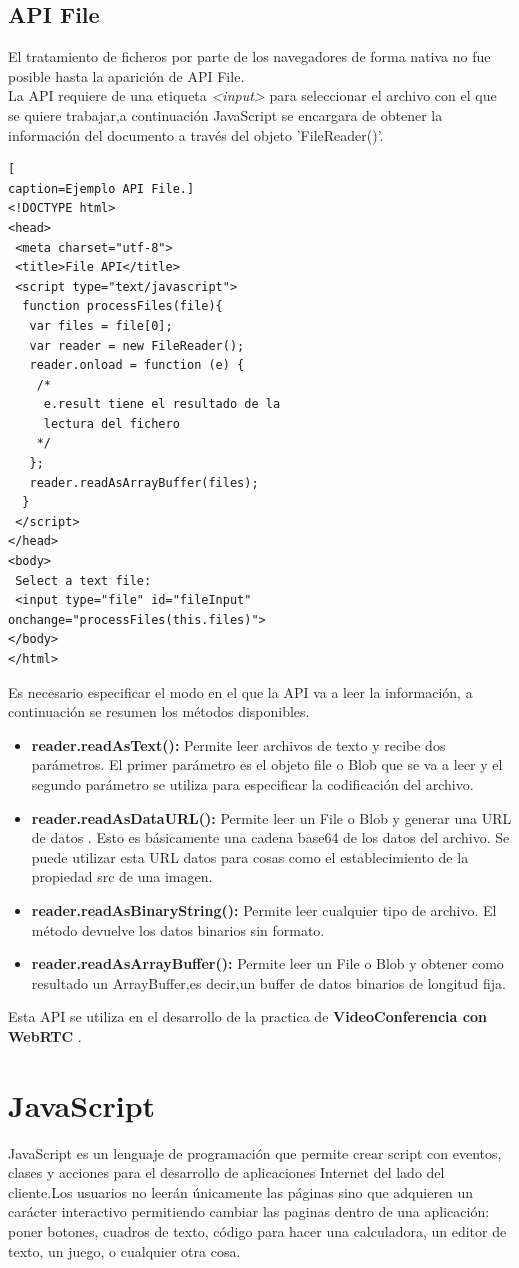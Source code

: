 \subsection{API File}
El tratamiento de ficheros por parte de los navegadores de forma nativa no fue posible hasta la aparición de API File\cite{APIFile}.
\\La API requiere de una etiqueta \textit{<input>} para seleccionar el archivo con el que se quiere trabajar,a continuación JavaScript se encargara de obtener la información del documento a través del objeto 'FileReader()'.
\begin{lstlisting}[
caption=Ejemplo API File.]
<!DOCTYPE html>
<head>
 <meta charset="utf-8">
 <title>File API</title>
 <script type="text/javascript">
  function processFiles(file){
   var files = file[0];
   var reader = new FileReader();
   reader.onload = function (e) {
    /*
     e.result tiene el resultado de la 
     lectura del fichero
    */
   };
   reader.readAsArrayBuffer(files);
  }
 </script>
</head>
<body>
 Select a text file:
 <input type="file" id="fileInput" onchange="processFiles(this.files)">
</body>
</html>
\end{lstlisting}
Es necesario especificar el modo en el que la API va a leer la información, a continuación se resumen los métodos disponibles.
\begin{itemize}
\item \textbf{reader.readAsText():} Permite leer archivos de texto y recibe dos parámetros. El primer parámetro es el objeto file o Blob que se va a leer y el segundo parámetro se utiliza para especificar la codificación del archivo.
\item \textbf{reader.readAsDataURL():} Permite leer un File o Blob y generar una URL de datos . Esto es básicamente una cadena base64 de los datos del archivo. Se puede utilizar esta URL datos para cosas como el establecimiento de la propiedad src de una imagen.
\item \textbf{reader.readAsBinaryString():} Permite leer cualquier tipo de archivo. El método devuelve los datos binarios sin formato.
\item \textbf{reader.readAsArrayBuffer():} Permite leer un File o Blob y obtener como resultado un ArrayBuffer,es decir,un buffer de datos binarios de longitud fija.
\end{itemize}
Esta API se utiliza en el desarrollo de la practica de \textbf{VideoConferencia con WebRTC} .
\section{JavaScript}
JavaScript\cite{javascript} es un lenguaje de programación que permite crear script con eventos, clases y acciones para el desarrollo de aplicaciones Internet del lado del cliente.Los usuarios no leerán únicamente las páginas sino que adquieren un carácter interactivo permitiendo cambiar las paginas dentro de una aplicación: poner botones, cuadros de texto, código para hacer una calculadora, un editor de texto, un juego, o cualquier otra cosa.
